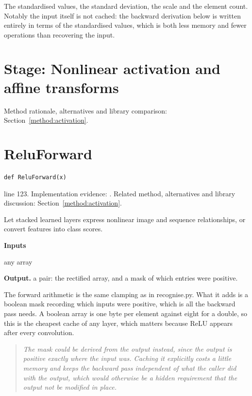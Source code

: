 The standardised values, the standard deviation, the scale and the element count. Notably the input itself is not cached: the backward derivation below is written entirely in terms of the standardised values, which is both less memory and fewer operations than recovering the input.



\section*{Stage: Nonlinear activation and affine transforms}
Method rationale, alternatives and library comparison: Section~\ref{method:activation}.
\section{ReluForward}\label{fn:train:ReluForward}
\begin{lstlisting}[style=sig]
def ReluForward(x)
\end{lstlisting}
 line 123. Implementation evidence: \cite{code2026}. Related method, alternatives and library discussion: Section~\ref{method:activation}.


Let stacked learned layers express nonlinear image and sequence relationships, or convert features into class scores.




\noindent\textbf{Inputs}
\begin{description}[leftmargin=2.2em,style=nextline,font=\normalfont\ttfamily]\setlength\itemsep{1pt}
  \item[{x}] \normalfont any array
\end{description}

\noindent\textbf{Output.} a pair: the rectified array, and a mask of which entries were positive.


The forward arithmetic is the same clamping as in recognise.py. What it adds is a boolean mask recording which inputs were positive, which is all the backward pass needs. A boolean array is one byte per element against eight for a double, so this is the cheapest cache of any layer, which matters because ReLU appears after every convolution.


\begin{quote}\small\itshape The mask could be derived from the output instead, since the output is positive exactly where the input was. Caching it explicitly costs a little memory and keeps the backward pass independent of what the caller did with the output, which would otherwise be a hidden requirement that the output not be modified in place.\end{quote}


